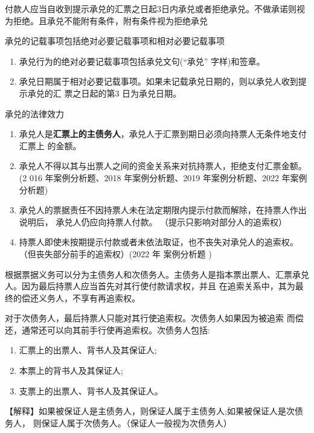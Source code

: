 \documentclass[UTF8,12pt]{ctexart}
\numberwithin{equation}{section} %
\numberwithin{figure}{section}
\numberwithin{table}{section}
\begin{document}
	付款人应当自收到提示承兑的汇票之日起3日内承兑或者拒绝承兑。不做承诺则视为拒绝。且承兑不能附有条件，附有条件视为拒绝承兑
	
	承兑的记载事项包括绝对必要记载事项和相对必要记载事项
	\begin{enumerate}
		\item 承兑行为的绝对必要记载事项包括承兑文句(“承兑” 字样)和签章。
		
		\item 承兑日期属于相对必要记载事项。如果未记载承兑日期的，则以承兑人收到提示承兑的汇 票之日起的第3 日为承兑日期。
	\end{enumerate}
	
	承兑的法律效力 
	\begin{enumerate}
		\item 承兑人是\textbf{汇票上的主债务人}，承兑人于汇票到期日必须向持票人无条件地支付汇票上 的金额。
		
		\item 承兑人不得以其与出票人之间的资金关系来对抗持票人，拒绝支付汇票金额。(2 016 年案例分析题、2018 年案例分析题、2019 年案例分析题、2022 年案例分析题) 
		
		\item 承兑人的票据责任不因持票人未在法定期限内提示付款而解除，在持票人作出说明后， 承兑人仍应向持票人付款。 （提示只影响对部分人的追索权）
		
		\item 持票人即使未按期提示付款或者未依法取证，也不丧失对承兑人的追索权。（但丧失部分前手的追索权）(2022 年 案例分析题 )
	\end{enumerate}
	
	根据票据义务可以分为主债务人和次债务人。主债务人是指本票出票人、汇票承兑人。因为最后持票人应当首先对其行使付款请求权，并且 在追索关系中，其为最终的偿还义务人，不享有再追索权。
	
	对于次债务人，最后持票人只能对其行使追索权。次债务人如果因为被追索 而偿还，通常还可以向其前手行使再追索权。次债务人包括:
	\begin{enumerate}
		\item 汇票上的出票人、背书人及其保证人;
		
		\item 本票上的背书人及其保证人;
		
		\item 支票上的出票人、背书人及其保证人。 
	\end{enumerate}
	【解释】如果被保证人是主债务人，则保证人属于主债务人;如果被保证人是次债务人， 则保证人属于次债务人。（保证人一般视为次债务人）
	
\end{document}
